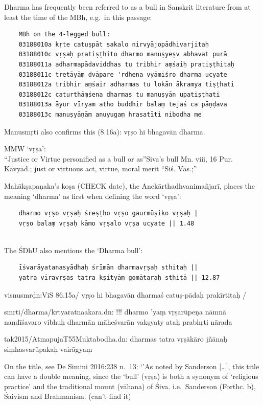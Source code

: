 \documentclass[12pt]{book}
\begin{document}
Dharma has frequently been referred to as a bull in Sanskrit literature
from at least the time of the MBh, e.g.~in this passage:

\begin{verbatim}
    MBh on the 4-legged bull:
    03188010a kṛte catuṣpāt sakalo nirvyājopādhivarjitaḥ
    03188010c vṛṣaḥ pratiṣṭhito dharmo manuṣyeṣv abhavat purā
    03188011a adharmapādaviddhas tu tribhir aṃśaiḥ pratiṣṭhitaḥ
    03188011c tretāyāṃ dvāpare 'rdhena vyāmiśro dharma ucyate
    03188012a tribhir aṃśair adharmas tu lokān ākramya tiṣṭhati
    03188012c caturthāṃśena dharmas tu manuṣyān upatiṣṭhati
    03188013a āyur vīryam atho buddhir balaṃ tejaś ca pāṇḍava
    03188013c manuṣyāṇām anuyugaṃ hrasatīti nibodha me
\end{verbatim}

Manusmṛti also confirms this (8.16a): vṛṣo hi bhagavān dharma.

MMW `vṛṣa':\\
``Justice or Virtue personified as a bull or as''Siva's bull Mn. viii,
16 Pur. Kāvyād.; just or virtuous act, virtue, moral merit ``Siś.
Vās.;''

Mahākṣapaṇaka's koṣa (CHECK date), the Anekārthadhvanimañjarī, places
the meaning `dharma' as first when defining the word `vṛṣa':

\begin{verbatim}
    dharmo vṛṣo vṛṣaḥ śreṣṭho vṛṣo gaurmūṣiko vṛṣaḥ |
    vṛṣo balaṃ vṛṣaḥ kāmo vṛṣalo vṛṣa ucyate || 1.48
    
\end{verbatim}

The ŚDhU also mentions the `Dharma bull':

\begin{verbatim}
    īśvarāyatanasyādhaḥ śrīmān dharmavṛṣaḥ sthitaḥ ||
    yatra vīravṛṣas tatra kṣityāṃ gomātaraḥ sthitā || 12.87
\end{verbatim}

visnusmrḍn:ViS 86.15a/ vṛṣo hi bhagavān dharmaś catuṣ-pādaḥ prakīrtitaḥ
/

smrti/dharma/krtyaratnaakara.dn: !!! dharmo 'yaṃ vṛṣarūpeṇa nāmnā
nandīśavaro vibhuḥ \textbar{} dharmān māheśvarān vakṣyaty ataḥ prabhṛti
nārada\textbar{}\textbar{}

tak2015/AtmapujaT55Muktabodha.dn: dharmas tatra vṛṣākāro jñānaḥ
siṃhasvarūpakaḥ \textbar{} vairāgyaṃ

On the title, see De Simini 2016:238 n.~13: `'As noted by Sanderson
{[}\ldots{}{]}, this title can have a double meaning, since the `bull'
(vṛṣa) is both a synonym of `religious practice' and the traditional
mount (vāhana) of Śiva. i.e.~Sanderson (Forthc. b), Śaivism and
Brahmanism. (can't find it)
\end{document}
